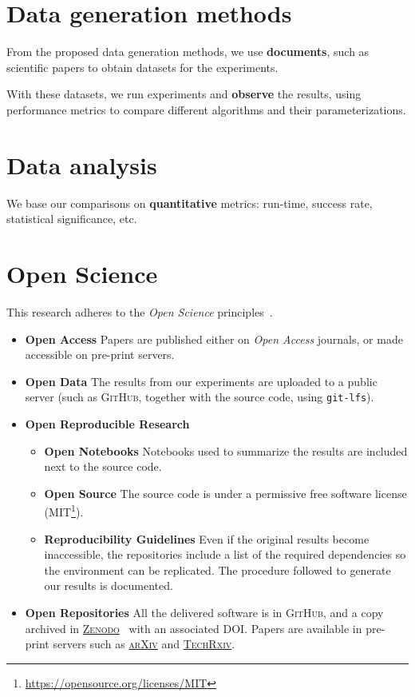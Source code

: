 

\section{Data generation methods}
From the proposed data generation methods, we use \textbf{documents},
such as scientific papers to obtain datasets for the experiments.

With these datasets, we run experiments and \textbf{observe} the results,
using performance metrics to compare different algorithms and their parameterizations.

\section{Data analysis}
We base our comparisons on \textbf{quantitative} metrics: run-time, success rate,
statistical significance, etc.

\section{Open Science}
This research adheres to the \emph{Open Science} principles~\cite{oro44719}.

\begin{itemize}
    \item \textbf{Open Access} Papers are published either on \emph{Open Access} journals,
        or made accessible on pre-print servers.
    \item \textbf{Open Data} The results from our experiments are uploaded to a public
        server (such as \textsc{GitHub}, together with the source code, using \texttt{git-lfs}).
    \item \textbf{Open Reproducible Research} 
        \begin{itemize}
            \item \textbf{Open Notebooks} Notebooks used to summarize the results are
                included next to the source code.
            \item \textbf{Open Source} The source code is under a permissive free software license
                (MIT\footnote{\url{https://opensource.org/licenses/MIT}}).
            \item \textbf{Reproducibility Guidelines} Even if the original results become
            inaccessible, the repositories include a list of the required dependencies so the
            environment can be replicated. The procedure followed to generate our results is documented.
        \end{itemize}
    \item \textbf{Open Repositories} All the delivered software is in \textsc{GitHub},
        and a copy archived in \href{https://zenodo.org/}{\textsc{Zenodo}}~\cite{zenodo} with an
        associated DOI. Papers are available in pre-print servers such as
        \href{https://arxiv.org/}{\textsc{arXiv}} and
        \href{https://www.techrxiv.org}{\textsc{TechRxiv}}.
\end{itemize}
